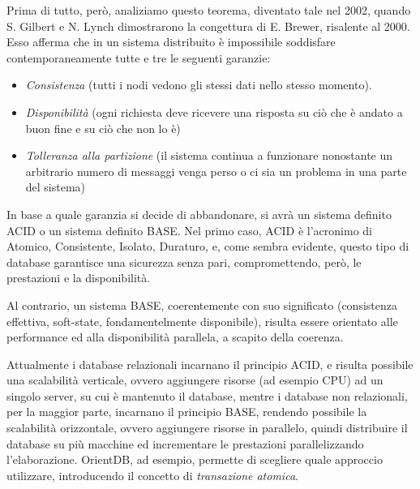 Prima di tutto, però, analiziamo questo teorema, diventato tale nel 2002, quando S. Gilbert e N. Lynch dimostrarono la congettura di E. Brewer, risalente al 2000. Esso afferma che in un sistema distribuito è impossibile soddisfare contemporaneamente tutte e tre le seguenti garanzie:
\begin{itemize}
\item \emph{Consistenza} (tutti i nodi vedono gli stessi dati nello stesso momento).
\item \emph{Disponibilità} (ogni richiesta deve ricevere una risposta su ciò che è andato a buon fine e su ciò che non lo è)
\item \emph{Tolleranza alla partizione} (il sistema continua a funzionare nonostante un arbitrario numero di messaggi venga perso o ci sia un problema in una parte del sistema)
\end{itemize}

In base a quale garanzia si decide di abbandonare, si avrà un sistema definito ACID o un sistema definito BASE. Nel primo caso, ACID è l'acronimo di Atomico, Consistente, Isolato, Duraturo, e, come sembra evidente, questo tipo di database garantisce una sicurezza senza pari, compromettendo, però, le prestazioni e la disponibilità.

Al contrario, un sistema BASE, coerentemente con suo significato (consistenza effettiva, soft-state, fondamentelmente disponibile), risulta essere orientato alle performance ed alla disponibilità parallela, a scapito della coerenza.

Attualmente i database relazionali incarnano il principio ACID, e risulta possibile una scalabilità verticale, ovvero aggiungere risorse (ad esempio CPU) ad un singolo server, su cui è mantenuto il database, mentre i database non relazionali, per la maggior parte, incarnano il principio BASE, rendendo possibile la scalabilità orizzontale, ovvero aggiungere risorse in parallelo, quindi distribuire il database su più macchine ed incrementare le prestazioni parallelizzando l'elaborazione. OrientDB, ad esempio, permette di scegliere quale approccio utilizzare, introducendo il concetto di \emph{transazione atomica}.

